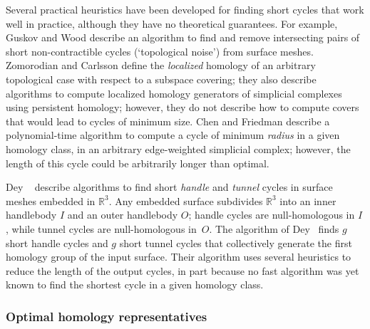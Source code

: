 \documentclass[11pt,twoside]{article}
\def\Real{\mathbb{R}}
\begin{document}
Several practical heuristics have been developed for finding short cycles that work well in practice, although they have no theoretical guarantees.  For example, Guskov and Wood \cite{gw-tnr-01} describe an algorithm to find and remove intersecting pairs of short non-contractible cycles (`topological noise') from surface meshes.  Zomorodian and Carlsson \cite{zc-lh-07} define the \emph{localized} homology of an arbitrary topological case with respect to a subspace covering; they also describe algorithms to compute localized homology generators of simplicial complexes using persistent homology; however, they do not describe how to compute covers that would lead to cycles of minimum size.  Chen and Friedman \cite{cf-qhc2-07, cf-qhc-08} describe a polynomial-time algorithm to compute a cycle of minimum \emph{radius} in a given homology class, in an arbitrary edge-weighted simplicial complex; however, the length of this cycle could be arbitrarily longer than optimal.

Dey \etal~\cite{dls-chtl-07, dlsc-cgaht-08} describe algorithms to find short \emph{handle} and \emph{tunnel} cycles in surface meshes embedded in $\Real^3$.  Any embedded surface subdivides $\Real^3$ into an inner handlebody $I$ and an outer handlebody $O$; handle cycles are null-homologous in $I$, while tunnel cycles are null-homologous in~$O$.  The algorithm of Dey \etal\ finds $g$ short handle cycles and $g$ short tunnel cycles that collectively generate the first homology group of the input surface.  Their algorithm uses several heuristics to reduce the length of the output cycles, in part because no fast algorithm was yet known to find the shortest cycle in a given homology class.

\subsubsection*{Optimal homology representatives}
\end{document}
